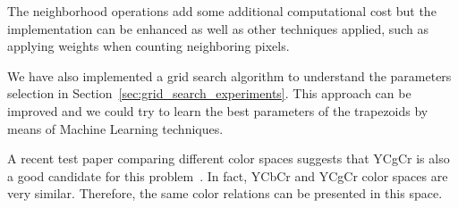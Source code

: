 The neighborhood operations add some additional computational cost but the implementation can be enhanced as well as other techniques applied, such as applying weights when counting neighboring pixels.

We have also implemented a grid search algorithm to understand the parameters selection in Section~\ref{sec:grid_search_experiments}. This approach can be improved and we could try to learn the best parameters of the trapezoids by means of Machine Learning techniques.

A recent test paper comparing different color spaces suggests that YCgCr is also a good candidate for this problem~\citep{chaves:10}. In fact, YCbCr and YCgCr color spaces are very similar. Therefore, the same color relations can be presented in this space.

